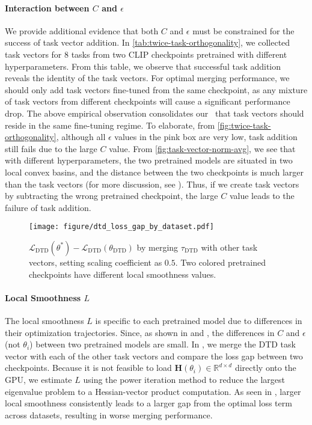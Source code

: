 \paragraph{Interaction between $C$ and $\epsilon$}
We provide additional evidence that both $C$ and $\epsilon$ must be constrained for the success of task vector addition. In \cref{tab:twice-task-orthogonality}, we collected task vectors for 8 tasks from two CLIP checkpoints pretrained with different hyperparameters. From this table, we observe that successful task addition reveals the identity of the task vectors. For optimal merging performance, we should only add task vectors fine-tuned from the same checkpoint, as any mixture of task vectors from different checkpoints will cause a significant performance drop. The above empirical observation consolidates our~ that task vectors should reside in the same fine-tuning regime. To elaborate, from \cref{fig:twice-task-orthogonality}, although all $\epsilon$ values in the pink box are very low, task addition still fails due to the large $C$ value. From \cref{fig:task-vector-norm-avg}, we see that with different hyperparameters, the two pretrained models are situated in two local convex basins, and the distance between the two checkpoints is much larger than the task vectors (for more discussion, see ). Thus, if we create task vectors by subtracting the wrong pretrained checkpoint, the large $C$ value leads to the failure of task addition.

\begin{figure}[tb]
    \centering
    \texttt{[image: figure/dtd\_loss\_gap\_by\_dataset.pdf]}
    \vspace{-0.8cm}
    \caption{$\mathcal{L}_\text{DTD}(\theta^*) - \mathcal{L}_\text{DTD}(\theta_\text{DTD})$ by merging $\tau_\text{DTD}$ with other task vectors, setting scaling coefficient as $0.5$. Two colored pretrained checkpoints have different local smoothness values.}
    \label{fig:dtd_smoothness}
\end{figure}

\paragraph{Local Smoothness $L$}
The local smoothness $L$ is specific to each pretrained model due to differences in their optimization trajectories. Since, as shown in  and , the differences in $C$ and $\epsilon$ (not $\theta_i$) between two pretrained models are small. In , we merge the DTD task vector with each of the other task vectors and compare the loss gap between two checkpoints. Because it is not feasible to load $\mathbf{H}(\theta_i) \in \mathbb{R}^{d \times d}$ directly onto the GPU, we estimate $L$ using the power iteration method \citep{mises1929praktische} to reduce the largest eigenvalue problem to a Hessian-vector product computation. As seen in , larger local smoothness consistently leads to a larger gap from the optimal loss term across datasets, resulting in worse merging performance.


